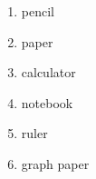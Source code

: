 \documentclass[11]{article}
\begin{document}
	\begin{enumerate} %
		\item pencil
		\item paper
		\item calculator
		\item notebook
		\item ruler
		\item graph paper
	\end{enumerate}
\end{document}
